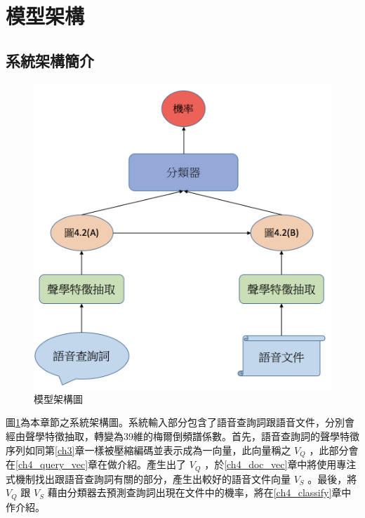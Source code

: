 \section{模型架構}
\subsection{系統架構簡介}
\begin{figure}[h]
\centering
\includegraphics[scale=0.5]{images/ch4_model.png} 
\caption{模型架構圖}
\label{ch4_system}
\end{figure}
圖\ref{ch4_system}為本章節之系統架構圖。系統輸入部分包含了語音查詢詞跟語音文件，分別會經由聲學特徵抽取，轉變為39維的梅爾倒頻譜係數。首先，語音查詢詞的聲學特徵序列如同第\ref{ch3}章一樣被壓縮編碼並表示成為一向量，此向量稱之
$V_Q$ ，此部分會在\ref{ch4_query_vec}章在做介紹。產生出了 $V_Q$
，於\ref{ch4_doc_vec}章中將使用專注式機制找出跟語音查詢詞有關的部分，產生出較好的語音文件向量
$V_S$ 。最後，將 $V_Q$ 跟 $V_S$ 藉由分類器去預測查詢詞出現在文件中的機率，將在\ref{ch4_classify}章中作介紹。

